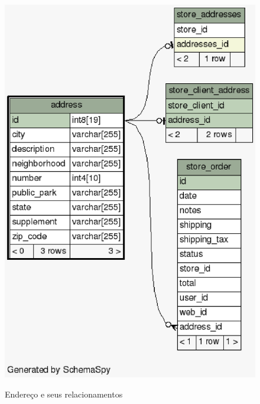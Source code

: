 \documentclass[a4paper,12pt]{monografia}
\begin{document}
\begin{figure}[H]
\centering
\caption{Endereço e seus relacionamentos}
\centering
\includegraphics[scale=0.7]{img/diagramas/schema/address.1degree.png.eps}\\
\end{figure}
\end{document}
